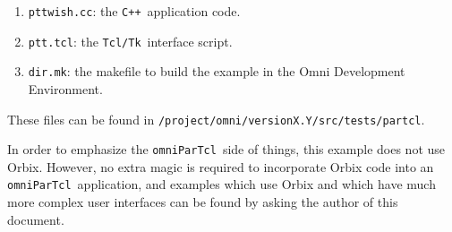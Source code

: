 \documentclass[11pt]{article}
\def\omniParTcl{{\tt omniParTcl}}
\def\tcltk{{\tt Tcl/Tk}}
\def\CXX{{\tt C++}}
\begin{document}
\begin{enumerate}
\item {\tt pttwish.cc}: the \CXX\ application code.
\item {\tt ptt.tcl}: the \tcltk\ interface script.
\item {\tt dir.mk}: the makefile to build the example in the Omni
                       Development Environment.
\end{enumerate}

\noindent
These files can be found in
{\tt /project/omni/versionX.Y/src/tests/partcl}.

\medskip

In order to emphasize the \omniParTcl\ side of things, this example does
not use Orbix.  However, no extra magic is required to incorporate Orbix
code into an \omniParTcl\ application, and examples which use Orbix
and which have much more complex user interfaces can be found by asking the
author of this document.
\end{document}
